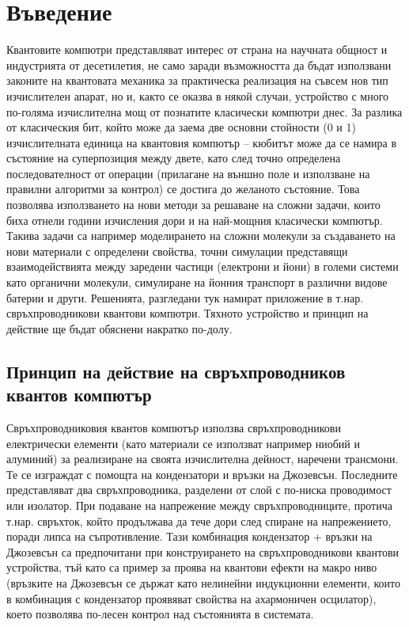 \chapter{Въведение}

    \normalsize Квантовите компютри представляват интерес от страна на научната общност и индустрията от десетилетия, не само заради възможността
    да бъдат използвани законите на квантовата механика за практическа реализация на съвсем нов тип изчислителен апарат,
    но и, както се оказва в някой случаи, устройство с много по-голяма изчислителна мощ от познатите класически компютри
    днес. За разлика от класическия бит, който може да заема две основни стойности (0 и 1) изчислителната единица на квантовия
    компютър -- кюбитът може да се намира в състояние на суперпозиция между двете, като след точно определена последователност от
    операции (прилагане на външно поле и използване на правилни алгоритми за контрол) се достига до желаното състояние. Това позволява
    използването на нови методи за решаване на сложни задачи, които биха отнели години изчисления дори и на най-мощния класически компютър.
    Такива задачи са например моделирането на сложни молекули за създаването на нови материали с определени свойства, точни симулации представящи
    взаимодействията между заредени частици (електрони и йони) в големи системи като органични молекули, симулиране на йонния транспорт в различни
    видове батерии и други.
    Решенията, разгледани тук намират приложение в т.нар. свръхпроводникови квантови компютри. Тяхното устройство и принцип на действие
    ще бъдат обяснени накратко по-долу.

    \section{Принцип на действие на свръхпроводников квантов компютър}
    
    Свръхпроводниковия квантов компютър използва свръхпроводникови електрически елементи (като материали се използват например ниобий и алуминий) за реализиране на своята изчислителна
    дейност, наречени трансмони. Те се изграждат с помощта на кондензатори и връзки на Джозевсън. Последните представляват два свръхпроводника, разделени
    от слой с по-ниска проводимост или изолатор. При подаване на напрежение между свръхпроводниците, протича т.нар. свръхток, който продължава
    да тече дори след спиране на напрежението, поради липса на съпротивление. Тази комбинация кондензатор + връзки на Джозевсън са предпочитани при конструирането на
    свръхпроводникови квантови устройства, тъй като са пример за проява на квантови ефекти на макро ниво (връзките на Джозевсън се държат като нелинейни
    индукционни елементи, които в комбинация с кондензатор проявяват свойства на ахармоничен осцилатор), което позволява по-лесен контрол над състоянията в системата.\\

